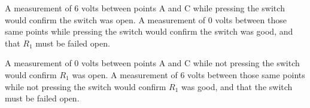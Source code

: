\vskip 10pt

A measurement of 6 volts between points A and C while pressing the switch would confirm the switch was open.  A measurement of 0 volts between those same points while pressing the switch would confirm the switch was good, and that $R_1$ must be failed open.

\vskip 10pt

A measurement of 0 volts between points A and C while not pressing the switch would confirm $R_1$ was open.  A measurement of 6 volts between those same points while not pressing the switch would confirm $R_1$ was good, and that the switch must be failed open.




